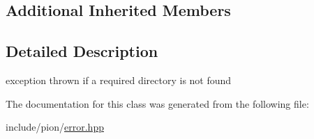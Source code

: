 \subsection*{Additional Inherited Members}


\subsection{Detailed Description}
exception thrown if a required directory is not found 

The documentation for this class was generated from the following file\-:\begin{DoxyCompactItemize}
\item 
include/pion/\hyperlink{error_8hpp}{error.\-hpp}\end{DoxyCompactItemize}

